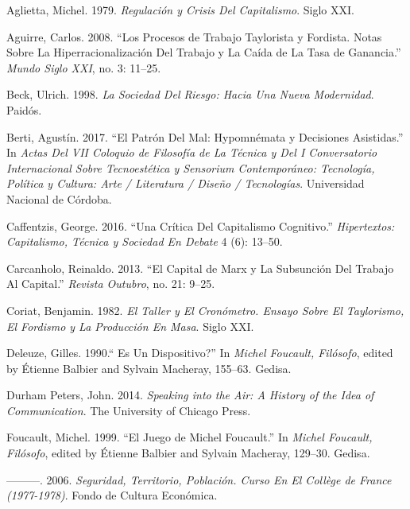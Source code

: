 \documentclass[
]{interact}
\newlength{\cslhangindent}
\newenvironment{CSLReferences}[2] %
 {\begin{list}{}{%
  \setlength{\itemindent}{0pt}
  \setlength{\leftmargin}{0pt}
  \setlength{\parsep}{0pt}
  \ifodd #1
   \setlength{\leftmargin}{\cslhangindent}
   \setlength{\itemindent}{-1\cslhangindent}
  \fi
  \setlength{\itemsep}{#2\baselineskip}}}
 {\end{list}}
\begin{document}
\label{refs}
\begin{CSLReferences}{1}{0}
Aglietta, Michel. 1979. \emph{Regulación y Crisis Del Capitalismo}.
Siglo XXI.

Aguirre, Carlos. 2008. {``Los Procesos de Trabajo Taylorista y Fordista.
{Notas} Sobre La Hiperracionalización Del Trabajo y La Caída de La Tasa
de Ganancia.''} \emph{Mundo Siglo XXI}, no. 3: 11--25.

Beck, Ulrich. 1998. \emph{La {Sociedad} Del {Riesgo}: {Hacia} Una Nueva
Modernidad}. Paidós.

Berti, Agustín. 2017. {``El Patrón Del Mal: Hypomnémata y Decisiones
Asistidas.''} In \emph{Actas Del {VII Coloquio} de {Filosofía} de La
{Técnica} y Del {I Conversatorio Internacional} Sobre {Tecnoestética} y
{Sensorium Contemporáneo}: {Tecnología}, Política y Cultura: Arte /
Literatura / Diseño / Tecnologías}. Universidad Nacional de Córdoba.

Caffentzis, George. 2016. {``Una Crítica Del Capitalismo Cognitivo.''}
\emph{Hipertextos: Capitalismo, Técnica y Sociedad En Debate} 4 (6):
13--50.

Carcanholo, Reinaldo. 2013. {``El {Capital} de {Marx} y La Subsunción
Del Trabajo Al Capital.''} \emph{Revista Outubro}, no. 21: 9--25.

Coriat, Benjamin. 1982. \emph{El Taller y El Cronómetro. {Ensayo} Sobre
El Taylorismo, El Fordismo y La Producción En Masa}. Siglo XXI.

Deleuze, Gilles. 1990.{`` Es Un
Dispositivo?''} In \emph{Michel {Foucault}, {Filósofo}}, edited by
Étienne Balbier and Sylvain Macheray, 155--63. Gedisa.

Durham Peters, John. 2014. \emph{Speaking into the Air: {A} History of
the Idea of Communication}. The University of Chicago Press.

Foucault, Michel. 1999. {``El Juego de {Michel Foucault}.''} In
\emph{Michel {Foucault}, {Filósofo}}, edited by Étienne Balbier and
Sylvain Macheray, 129--30. Gedisa.

---------. 2006. \emph{Seguridad, {Territorio}, {Población}. {Curso} En
El {Collège} de {France} (1977-1978)}. Fondo de Cultura Económica.


\end{CSLReferences}
\end{document}
